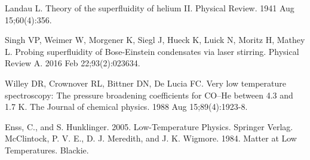 \documentclass[a4paper,11pt]{article}
\begin{document}
\begin{thebibliography}{99}
    Landau L. Theory of the superfluidity of helium II. Physical Review. 1941 Aug 15;60(4):356.
  
     Singh VP, Weimer W, Morgener K, Siegl J, Hueck K, Luick N, Moritz H, Mathey L. Probing superfluidity of Bose-Einstein condensates via laser stirring. Physical Review A. 2016 Feb 22;93(2):023634.
    
     Willey DR, Crownover RL, Bittner DN, De Lucia FC. Very low temperature spectroscopy: The pressure broadening coefficients for CO–He between 4.3 and 1.7 K. The Journal of chemical physics. 1988 Aug 15;89(4):1923-8.
    
    Enss, C., and S. Hunklinger. 2005. Low-Temperature Physics. Springer Verlag.
McClintock, P. V. E., D. J. Meredith, and J. K. Wigmore. 1984. Matter at Low Temperatures. Blackie.
\end{thebibliography}
\end{document}
